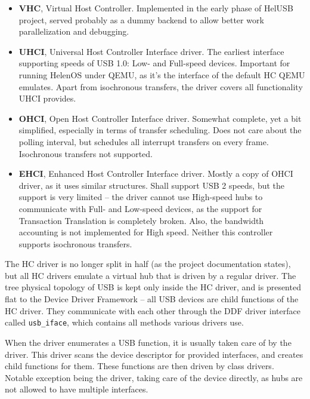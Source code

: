 \begin{itemize}
\item
	\textbf{VHC}, Virtual Host Controller. Implemented in the early phase of
	HelUSB project, served probably as a dummy backend to allow better work
	parallelization and debugging.

\item
	\textbf{UHCI}, Universal Host Controller Interface driver. The earliest
	interface supporting speeds of USB 1.0: Low- and Full-speed devices.
	Important for running HelenOS under QEMU, as it's the interface of the
	default HC QEMU emulates. Apart from isochronous transfers, the driver
	covers all functionality UHCI provides.

\item
	\textbf{OHCI}, Open Host Controller Interface driver. Somewhat complete,
	yet a bit simplified, especially in terms of transfer scheduling. Does not
	care about the polling interval, but schedules all interrupt transfers on
	every frame. Isochronous transfers not supported.

\item
	\textbf{EHCI}, Enhanced Host Controller Interface driver. Mostly a copy of
	OHCI driver, as it uses similar structures. Shall support USB 2 speeds, but
	the support is very limited -- the driver cannot use High-speed hubs to
	communicate with Full- and Low-speed devices, as the support for
	Transaction Translation is completely broken. Also, the bandwidth
	accounting is not implemented for High speed. Neither this controller
	supports isochronous transfers.
\end{itemize}

The HC driver is no longer split in half (as the project documentation states),
but all HC drivers emulate a virtual hub that is driven by a regular
 driver. The tree physical topology of USB is kept only inside the
HC driver, and is presented flat to the Device Driver Framework -- all USB
devices are child functions of the HC driver. They communicate with each other
through the DDF driver interface called \texttt{usb\_iface}, which contains all
methods various drivers use.

When the driver enumerates a USB function, it is usually taken care of by the
 driver. This driver scans the device descriptor for provided
interfaces, and creates child functions for them. These functions are then
driven by class drivers. Notable exception being the  driver,
taking care of the device directly, as hubs are not allowed to have multiple
interfaces.

